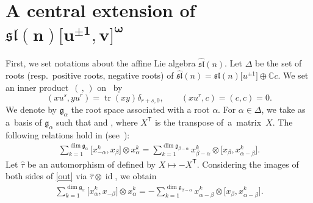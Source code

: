 \documentclass[10pt,a4paper]{amsart}
\numberwithin{equation}{section}
\theoremstyle{definition}
\DeclareMathOperator{\id}{id}
\DeclareMathOperator{\tr}{tr}
\begin{document}
\section[A central extension of sl(n){[u\^{}\{pm1\},v]}\^{}omega]{A central extension of $\boldsymbol{\mathfrak{sl}(n)\bigl[u^{\pm1},v\bigr]^\omega}$}\label{sec:3}
First, we set notations about the affine Lie algebra $\widehat{\mathfrak{sl}}(n)$.
Let $\Delta$  be the set of roots (resp.\ positive roots, negative roots) of $\widehat{\mathfrak{sl}}(n)=\mathfrak{sl}(n)\bigl[u^{\pm1}\bigr]\oplus\mathbb{C}c$.
We set an inner product~$(\, ,\, )$ on~ by
\begin{equation*}
(xu^s,yu^r)=\tr(xy)\delta_{r+s,0},\qquad (xu^r,c)=(c,c)=0.
\end{equation*}
We denote by $\mathfrak{g}_\alpha$ the root space associated with a root $\alpha$.
For $\alpha\in\Delta$, we take  as a~basis of $\mathfrak{g}_\alpha$ such that  and , where $X^{\mathsf{T}}$ is the transpose of~a~matrix~$X$.
The following relations hold in  (see~\cite[Corollary 2.4]{K}):
\begin{gather}
\sum_{k=1}^{\dim \mathfrak{g}_\alpha}\bigl[x_{-\alpha}^k,x_\beta\bigr]\otimes x_\alpha^k=\sum_{k=1}^{\dim \mathfrak{g}_{\beta-\alpha}}x_{\beta-\alpha}^k\otimes \bigl[x_\beta,x_{\alpha-\beta}^k\bigr].\label{out}
\end{gather}
Let $\widehat{\tau}$ be an automorphism of  defined by $X\mapsto-X^{\mathsf{T}}$. Considering the images of both sides of \eqref{out} via $\widehat{\tau}\otimes\id$, we obtain
\begin{gather}
\sum_{k=1}^{\dim \mathfrak{g}_\alpha}\bigl[x_{\alpha}^k,x_{-\beta}\bigr]\otimes x_\alpha^k=-\sum_{k=1}^{\dim \mathfrak{g}_{\beta-\alpha}}x_{\alpha-\beta}^k\otimes \bigl[x_\beta,x_{\alpha-\beta}^k\bigr].\label{out1}
\end{gather}
\end{document}
